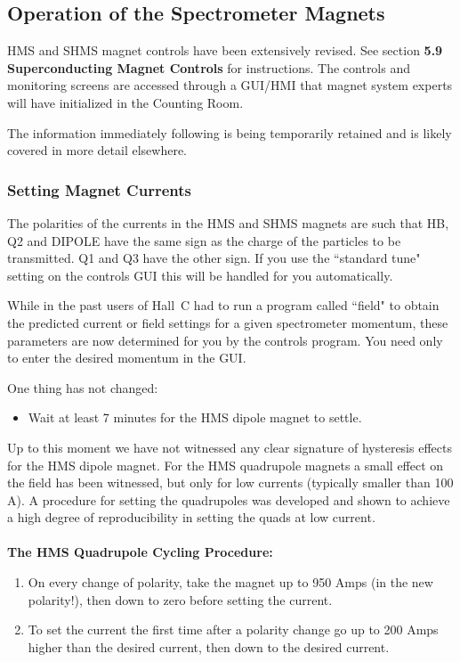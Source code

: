 {\subsection{Operation of the Spectrometer Magnets \label{ssec:operatemagnets}}

HMS and SHMS magnet controls have been extensively revised. See section
\textbf{5.9 Superconducting Magnet Controls} for instructions. The controls and
monitoring screens are accessed through a GUI/HMI that magnet system 
experts will have initialized in the Counting Room. 

The information immediately following is being temporarily retained and is likely
covered in more detail elsewhere.

\subsubsection{Setting Magnet Currents}

The polarities of the currents in the HMS and SHMS magnets are such that
HB, Q2 and DIPOLE have the same sign as the charge of the particles
to be transmitted. Q1 and Q3 have the other sign. If you use the ``standard
tune" setting on the controls GUI this will be handled for you automatically.

While in the past users of Hall~C had to run a program called ``field" to obtain
the predicted current or field settings for a given spectrometer momentum,
these parameters are now determined for you by the controls program. You
need only to enter the desired momentum in the GUI.

One thing has not changed:
\begin{itemize}
\item{Wait at least 7 minutes for the HMS dipole magnet to settle.}
\end{itemize}

Up to this moment we have not witnessed any clear signature of hysteresis
effects for the HMS dipole magnet. For the HMS quadrupole magnets a small effect
on the field has been witnessed, but only for low currents (typically smaller
than 100 A). A procedure for setting the quadrupoles was developed
and shown to achieve a high
degree of reproducibility in setting the quads at low current.  
\\
\\
\textbf{The HMS Quadrupole Cycling Procedure:} 
\begin{enumerate}
  \item{On every change of polarity, take the magnet up to 950 Amps 
     (in the new polarity!), then down to zero before setting the
     current.} 
  \item{To set the current the first time after a polarity change 
     go up to 200 Amps higher than the desired current, 
     then down to the desired current.

}
\end{enumerate}}
